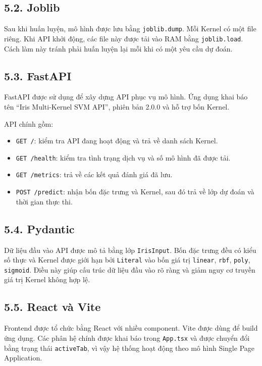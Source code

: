 \documentclass{article}
\begin{document}
	\subsection{5.2. Joblib}
	\hspace{0.5cm}
	Sau khi huấn luyện, mô hình được lưu bằng \texttt{joblib.dump}. Mỗi Kernel có một file riêng. Khi API khởi động, các file này được tải vào RAM bằng \texttt{joblib.load}. Cách làm này tránh phải huấn luyện lại mỗi khi có một yêu cầu dự đoán.
	
	\subsection{5.3. FastAPI}
	\hspace{0.5cm}
	FastAPI được sử dụng để xây dựng API phục vụ mô hình. Ứng dụng khai báo tên ``Iris Multi-Kernel SVM API'', phiên bản 2.0.0 và hỗ trợ bốn Kernel.
	
	API chính gồm:
	\begin{itemize}
		\item \texttt{GET /}: kiểm tra API đang hoạt động và trả về danh sách Kernel.
		\item \texttt{GET /health}: kiểm tra tình trạng dịch vụ và số mô hình đã được tải.
		\item \texttt{GET /metrics}: trả về các kết quả đánh giá đã lưu.
		\item \texttt{POST /predict}: nhận bốn đặc trưng và Kernel, sau đó trả về lớp dự đoán và thời gian thực thi.
	\end{itemize}
	
	\subsection{5.4. Pydantic}
	\hspace{0.5cm}
	Dữ liệu đầu vào API được mô tả bằng lớp \texttt{IrisInput}. Bốn đặc trưng đều có kiểu số thực và Kernel được giới hạn bởi \texttt{Literal} vào bốn giá trị \texttt{linear}, \texttt{rbf}, \texttt{poly}, \texttt{sigmoid}. Điều này giúp cấu trúc dữ liệu đầu vào rõ ràng và giảm nguy cơ truyền giá trị Kernel không hợp lệ.
	
	\subsection{5.5. React và Vite}
	\hspace{0.5cm}
	Frontend được tổ chức bằng React với nhiều component. Vite được dùng để build ứng dụng. Các phân hệ chính được khai báo trong \texttt{App.tsx} và được chuyển đổi bằng trạng thái \texttt{activeTab}, vì vậy hệ thống hoạt động theo mô hình Single Page Application.
	
\end{document}
